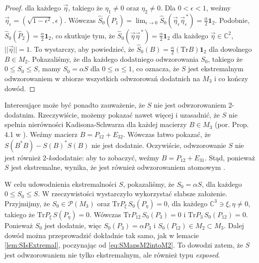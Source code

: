 \begin{proof}
dla każdego $\vec{\eta}$, takiego że $\eta_{1} \neq 0$ oraz $\eta_{2} \neq 0$.
Dla $0 \!<\!\epsilon \!<\! 1$,
weźmy $\vec{\eta}_{\epsilon} = (\sqrt{1 - \epsilon^{2}}, \epsilon)$.
Wówczas $\hat{S}_{0} (\hat{P}_{1}) =
\lim_{\epsilon \rightarrow 0} \hat{S}_{0}
    (\vec{\eta}_{\epsilon} \vec{\eta}_{\epsilon}^{\,*}) =
\frac{\alpha}{2} \mathbf{1}_{2}$.
Podobnie,
$\hat{S}_{0} (\hat{P}_{2}) = \frac{\alpha}{2} \mathbf{1}_{2}$,
co skutkuje tym, że
$\hat{S}_{0} (\vec{\eta} \vec{\eta}^{\,*}) = \frac{\alpha}{2} \mathbf{1}_{2}$
dla każdego $\vec{\eta} \in \mathbb{C}^{2}$,
$||\vec{\eta}|| = 1$.
To wystarczy, aby powiedzieć, że
$\hat{S}_{0}(B) = \frac{\alpha}{2} (\text{Tr} B) \mathbf{1}_{2}$
dla dowolnego $B \in M_{2}$.
Pokazaliśmy, że dla każdego dodatniego odwzorowania $S_{0}$, takiego że
$0 \leq S_{0} \leq S$, mamy
$S_{0} = \alpha S$ dla $0 \leq \alpha \leq 1$,
co oznacza, że $S$ jest ekstremalnym odwzorowaniem w zbiorze wszystkich
odwzorowań dodatnich na $M_{3}$ i co kończy dowód.
\end{proof}

Interesujące może być ponadto zauważenie, że $S$ nie jest odwzorowaniem
2-dodatnim.
Rzeczywiście,
możemy pokazać nawet więcej i uzasadnić, że $S$
nie spełnia nierówności Kadisona-Schwarza dla każdej macierzy
$B \in M_{3}$ (por. Prop.\,4.1 w \cite{choi1980some}).
Weźmy macierz
$B = P_{12} + E_{32}$.
Wówczas łatwo pokazać, że
$S(B^{*} B) - S(B)^{*} S(B)$
nie jest dodatnie.
Oczywiście, odwzorowanie $S$ nie jest również 2-\emph{ko}dodatnie:
aby to zobaczyć, weźmy $B = P_{12} + E_{31}$.
Stąd, ponieważ $S$ jest ekstremalne,
wynika, że jest również odwzorowaniem atomowym
\cite{ha1998atomic}.

W celu udowodnienia ekstremalności $S$,
pokazaliśmy, że $S_{0} = \alpha S$,
dla każdego $0 \leq S_{0} \leq S$.
W rzeczywistości wystarczyło wykorzystać słabsze założenie.
Przyjmijmy, że $S_{0} \in \mathcal{P}(M_{3})$ oraz
$\text{Tr} P_{\xi} \, S_{0}(P_{\eta}) = 0$,
dla każdego $\mathbb{C}^{3} \ni \xi,\eta \neq 0$,
takiego że $\text{Tr} P_{\xi} \, S(P_{\eta}) = 0$.
Wówczas $\text{Tr} P_{12} \, S_{0}(P_{3}) = 0$ i
$\text{Tr} P_{3} \, S_{0}(P_{12}) = 0$.
Ponieważ $S_{0}$ jest dodatnie, więc $S_{0}(P_{3}) = \alpha P_{3}$
i $S_{0}(P_{12}) \in M_{2} \! \subset \! M_{3}$.
Dalej dowód można przeprowadzić dokładnie tak samo, jak w
lemacie \ref{lem:SIsExtremal},
poczynając od \eqref{eq:SMapsM2intoM2}.
To dowodzi zatem, że $S$ jest odwzorowaniem nie tylko ekstremalnym,
ale również typu \emph{exposed}.

\vspace{0.5cm}

